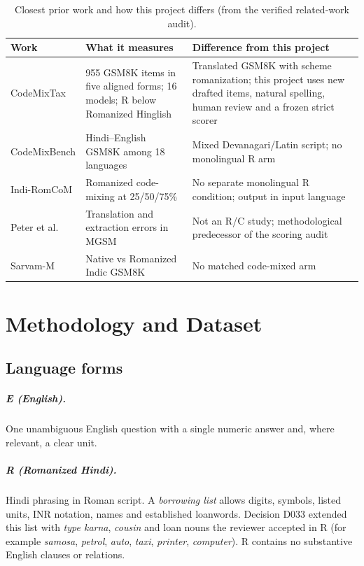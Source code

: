 \documentclass[12pt,a4paper,oneside]{report}
\renewcommand{\_}{\oldunderscore\allowbreak}
\begin{document}
\begin{table}[t]
\centering\small
\caption{Closest prior work and how this project differs (from the verified related-work audit).}
\label{tab:positioning}
\begin{tabularx}{\linewidth}{@{}p{2.6cm}LL@{}}
\toprule
Work & What it measures & Difference from this project\\
\midrule
CodeMixTax & 955 GSM8K items in five aligned forms; 16 models; R below Romanized Hinglish & Translated GSM8K with scheme romanization; this project uses new drafted items, natural spelling, human review and a frozen strict scorer\\
CodeMixBench & Hindi--English GSM8K among 18 languages & Mixed Devanagari/Latin script; no monolingual R arm\\
Indi-RomCoM & Romanized code-mixing at 25/50/75\% & No separate monolingual R condition; output in input language\\
Peter et al. & Translation and extraction errors in MGSM & Not an R/C study; methodological predecessor of the scoring audit\\
Sarvam-M & Native vs Romanized Indic GSM8K & No matched code-mixed arm\\
\bottomrule
\end{tabularx}
\end{table}

\chapter{Methodology and Dataset}
\label{ch:method}

\section{Language forms}
\label{sec:forms}

\paragraph{E (English).} One unambiguous English question with a single numeric answer and, where relevant, a clear unit.

\paragraph{R (Romanized Hindi).} Hindi phrasing in Roman script. A \emph{borrowing list} allows digits, symbols, listed units, INR notation, names and established loanwords. Decision D033 extended this list with \emph{type karna}, \emph{cousin} and loan nouns the reviewer accepted in R (for example \emph{samosa}, \emph{petrol}, \emph{auto}, \emph{taxi}, \emph{printer}, \emph{computer}). R contains no substantive English clauses or relations.
\end{document}
